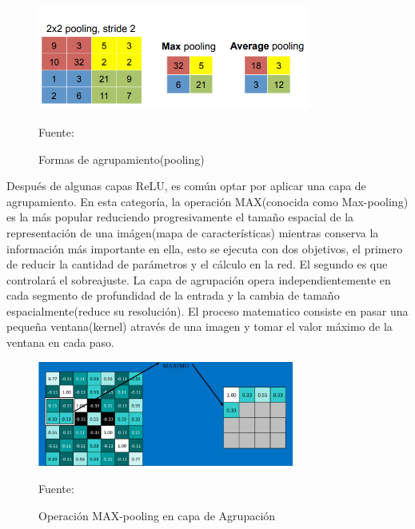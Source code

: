 		\begin{figure}[H]
		\begin{center}
		\includegraphics[width=0.8\textwidth]{images/marcoteorico/pooling}
		\end{center}
		\begin{center}
		\caption{\small{Formas de agrupamiento(pooling)}}
		\vskip -0.2cm  
		{\small{Fuente: \citep{caffe}}}
		\end{center}
		\vspace{-1.5em}
		\end{figure}

		Después de algunas capas ReLU, es común optar por aplicar una capa de agrupamiento. En esta categoría, la operación MAX(conocida como Max-pooling) es la más popular reduciendo progresivamente el tamaño espacial de la representación de una imágen(mapa de características) mientras conserva la información más importante en ella, esto se ejecuta con dos objetivos, el primero de reducir la cantidad de parámetros y el cálculo en la red. El segundo es que controlará el sobreajuste.
		\vskip 0.4cm 
		La capa de agrupación opera independientemente en cada segmento de profundidad de la entrada y la cambia de tamaño espacialmente(reduce su resolución). El proceso matematico consiste en pasar una pequeña ventana(kernel) através de una imagen y tomar el valor máximo de la ventana en cada paso. 


		\begin{figure}[H]
		\begin{center}
		\includegraphics[width=0.75\textwidth]{images/marcoteorico/pool1}
		\end{center}
		\begin{center}
		\caption{\small{Operación MAX-pooling en capa de Agrupación}}
		\vskip -0.2cm  
		{\small{Fuente: \citep{Rohrer}}}
		\end{center}
		\vspace{-1.5em}
		\end{figure}

